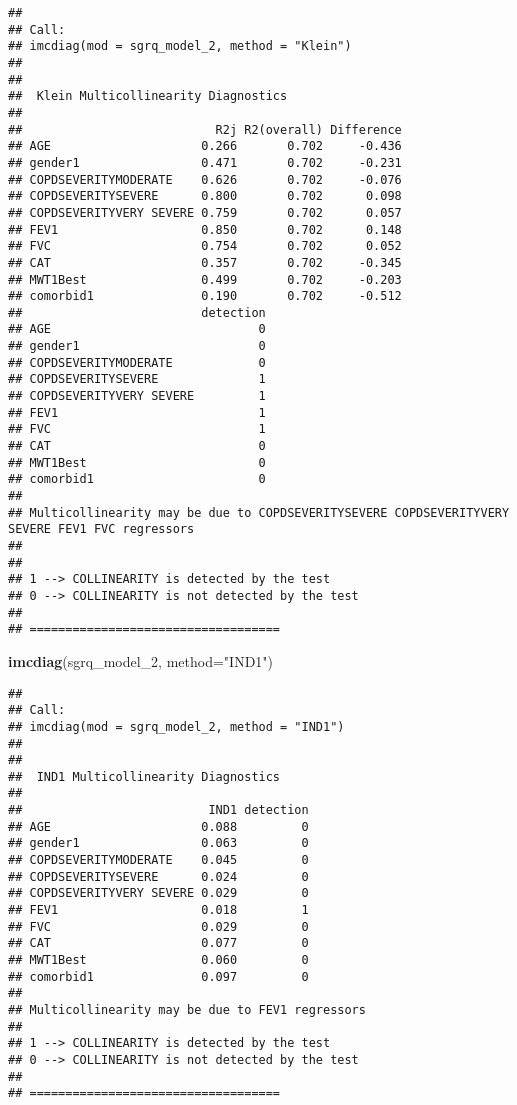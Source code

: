\documentclass[
]{article}
\newenvironment{Shaded}{\begin{snugshade}}{\end{snugshade}}
\newcommand{\AttributeTok}[1]{\textcolor[rgb]{0.13,0.29,0.53}{#1}}
\newcommand{\FunctionTok}[1]{\textcolor[rgb]{0.13,0.29,0.53}{\textbf{#1}}}
\newcommand{\NormalTok}[1]{#1}
\newcommand{\StringTok}[1]{\textcolor[rgb]{0.31,0.60,0.02}{#1}}
\begin{document}
\begin{verbatim}
## 
## Call:
## imcdiag(mod = sgrq_model_2, method = "Klein")
## 
## 
##  Klein Multicollinearity Diagnostics
## 
##                           R2j R2(overall) Difference
## AGE                     0.266       0.702     -0.436
## gender1                 0.471       0.702     -0.231
## COPDSEVERITYMODERATE    0.626       0.702     -0.076
## COPDSEVERITYSEVERE      0.800       0.702      0.098
## COPDSEVERITYVERY SEVERE 0.759       0.702      0.057
## FEV1                    0.850       0.702      0.148
## FVC                     0.754       0.702      0.052
## CAT                     0.357       0.702     -0.345
## MWT1Best                0.499       0.702     -0.203
## comorbid1               0.190       0.702     -0.512
##                         detection
## AGE                             0
## gender1                         0
## COPDSEVERITYMODERATE            0
## COPDSEVERITYSEVERE              1
## COPDSEVERITYVERY SEVERE         1
## FEV1                            1
## FVC                             1
## CAT                             0
## MWT1Best                        0
## comorbid1                       0
## 
## Multicollinearity may be due to COPDSEVERITYSEVERE COPDSEVERITYVERY SEVERE FEV1 FVC regressors
## 
## 
## 1 --> COLLINEARITY is detected by the test 
## 0 --> COLLINEARITY is not detected by the test
## 
## ===================================
\end{verbatim}

\begin{Shaded}
\begin{Highlighting}[]
\FunctionTok{imcdiag}\NormalTok{(sgrq\_model\_2, }\AttributeTok{method=}\StringTok{"IND1"}\NormalTok{)}
\end{Highlighting}
\end{Shaded}

\begin{verbatim}
## 
## Call:
## imcdiag(mod = sgrq_model_2, method = "IND1")
## 
## 
##  IND1 Multicollinearity Diagnostics
## 
##                          IND1 detection
## AGE                     0.088         0
## gender1                 0.063         0
## COPDSEVERITYMODERATE    0.045         0
## COPDSEVERITYSEVERE      0.024         0
## COPDSEVERITYVERY SEVERE 0.029         0
## FEV1                    0.018         1
## FVC                     0.029         0
## CAT                     0.077         0
## MWT1Best                0.060         0
## comorbid1               0.097         0
## 
## Multicollinearity may be due to FEV1 regressors
## 
## 1 --> COLLINEARITY is detected by the test 
## 0 --> COLLINEARITY is not detected by the test
## 
## ===================================
\end{verbatim}
\end{document}
